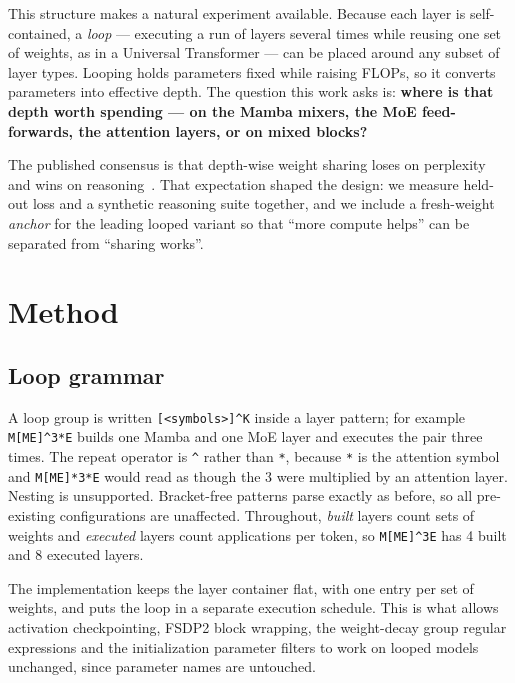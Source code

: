 \documentclass[11pt,a4paper]{article}
\newcommand{\lp}[1]{\texttt{#1}}
\newcommand{\caret}{\textasciicircum}
\begin{document}
This structure makes a natural experiment available. Because each layer is self-contained, a
\emph{loop} --- executing a run of layers several times while reusing one set of weights, as in a
Universal Transformer --- can be placed around any subset of layer types. Looping holds parameters
fixed while raising FLOPs, so it converts parameters into effective depth. The question this work
asks is: \textbf{where is that depth worth spending --- on the Mamba mixers, the MoE
feed-forwards, the attention layers, or on mixed blocks?}

The published consensus is that depth-wise weight sharing loses on perplexity and wins on
reasoning~\cite{saunshi,lssm}. That expectation shaped the design: we measure held-out loss and a
synthetic reasoning suite together, and we include a fresh-weight \emph{anchor} for the leading
looped variant so that ``more compute helps'' can be separated from ``sharing works''.

\section{Method}

\subsection{Loop grammar}

A loop group is written \lp{[\textless symbols\textgreater]\caret K} inside a layer pattern; for
example \lp{M[ME]\caret3*E} builds one Mamba and one MoE layer and executes the pair three times.
The repeat operator is \lp{\caret} rather than \lp{*}, because \lp{*} is the attention symbol and
\lp{M[ME]*3*E} would read as though the 3 were multiplied by an attention layer. Nesting is
unsupported. Bracket-free patterns parse exactly as before, so all pre-existing configurations are
unaffected. Throughout, \emph{built} layers count sets of weights and \emph{executed} layers count
applications per token, so \lp{M[ME]\caret3E} has 4 built and 8 executed layers.

The implementation keeps the layer container flat, with one entry per set of weights, and puts the
loop in a separate execution schedule. This is what allows activation checkpointing, FSDP2 block
wrapping, the weight-decay group regular expressions and the initialization parameter filters to
work on looped models unchanged, since parameter names are untouched.
\end{document}
